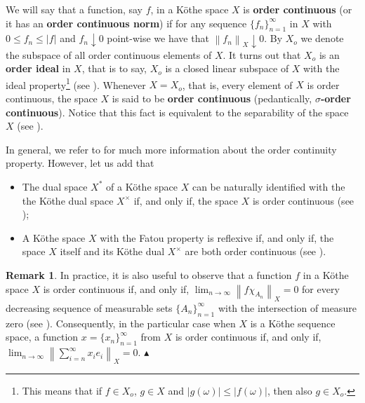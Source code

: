 \documentclass[11pt]{amsart}
\theoremstyle{definition}
\theoremstyle{definition}
\theoremstyle{definition}
\theoremstyle{definition}
\theoremstyle{definition}
\theoremstyle{definition}
\newtheorem{remark}[theorem]{Remark}
\theoremstyle{definition}
\theoremstyle{definition}
\numberwithin{equation}{section}
\numberwithin{equation}{section}
\numberwithin{equation}{section}
\theoremstyle{definition}
\theoremstyle{definition}
\theoremstyle{definition}
\theoremstyle{definition}
\theoremstyle{definition}
\theoremstyle{definition}
\newcommand{\norm}[1]{\left\lVert#1\right\rVert}
\newcommand{\abs}[1]{\left\lvert#1\right\rvert}
\newcommand\xqed[1]{%
	\leavevmode\unskip\penalty9999 \hbox{}\nobreak\hfill
	\quad\hbox{#1}}
\newcommand\demo{\xqed{{\Large $\blacktriangle$}}}
\begin{document}
We will say that a function, say $f$, in a K{\" o}the space $X$ is {\bf order continuous} (or it has an {\bf order continuous norm})
if for any sequence $\{f_n\}_{n=1}^\infty$ in $X$ with $0 \leqslant f_n \leqslant \abs{f}$ and $f_n \downarrow 0$ point-wise we have
that $\norm{f_n}_X \downarrow 0$.
By $X_o$ we denote the subspace of all order continuous elements of $X$. It turns out that $X_o$ is an {\bf order ideal} in $X$, that is to say,
$X_o$ is a closed linear subspace of $X$ with the ideal property\footnote{This means that if $f \in X_o$, $g \in X$ and $\abs{g(\omega)} \leqslant \abs{f(\omega)}$,
then also $g \in X_o$.} (see \cite[Theorem~3.8, p.~16]{BS88}).
Whenever $X = X_o$, that is, every element of $X$ is order continuous, the space $X$ is said to be {\bf order continuous} (pedantically, {\bf $\sigma$-order continuous}).
Notice that this fact is equivalent to the separability of the space $X$ (see \cite[Theorem~5.5, p.~27]{BS88}).

In general, we refer to \cite{Wn99} for much more information about the order continuity property. However, let us add that
\begin{itemize}
	\item[$\bullet$] The dual space $X^*$ of a K{\" o}the space $X$ can be naturally identified with the the K{\" o}the dual space $X^{\times}$ if, and only if,
		the space $X$ is order continuous (see \cite[Corollary~4.3, p.~23]{BS88});
	\item[$\bullet$] A K{\" o}the space $X$ with the Fatou property is reflexive if, and only if, the space $X$ itself and its K{\" o}the dual $X^{\times}$
		are both order continuous (see \cite[Corollary~4.4, p.~23]{BS88}).
\end{itemize}

\begin{remark}
	In practice, it is also useful to observe that a function $f$ in a K{\" o}the space $X$ is order continuous
	if, and only if, $\lim_{n \rightarrow \infty} \norm{f\chi_{A_n}}_X = 0$ for every decreasing sequence of measurable
	sets $\{A_n\}_{n=1}^{\infty}$ with the intersection of measure zero (see \cite[Proposition~3.5, p.~15]{BS88}).
	Consequently, in the particular case when $X$ is a K{\" o}the sequence space, a function $x = \{x_n\}_{n=1}^{\infty}$
	from $X$ is order continuous if, and only if, $\lim_{n \rightarrow \infty} \norm{ \sum_{i=n}^{\infty} x_i e_i }_X = 0$.
	\demo
\end{remark}
\end{document}
